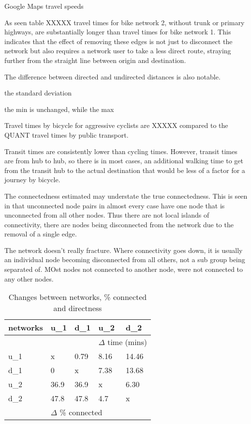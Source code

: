 \begin{table}
\centering
\caption{Google Maps travel speeds}
\label{table:travel_speeds}
\end{table}

As seen table XXXXX travel times for bike network 2, without trunk or primary highways, are substantially longer than travel times for bike network 1. This indicates that the effect of removing these edges is not just to disconnect the network but also requires a network user to take a less direct route, straying further from the straight line between origin and destination. 

The difference between directed and undirected distances is also notable. 

the standard deviation 

the min is unchanged, while the max 

Travel times by bicycle for aggressive cyclists are XXXXX compared to the QUANT travel times by public transport. 

Transit times are consistently lower than cycling times. However, transit times are from hub to hub, so there is in most cases, an additional walking time to get from the transit hub to the actual destination that would be less of a factor for a journey by bicycle. 

The connectedness estimated may understate the true connectedness. This is seen in that unconnected node pairs in almost every case have one node that is unconnected from all other nodes. Thus there are not local islands of connectivity, there are nodes being disconnected from the network due to the removal of a single edge. 

The network doesn't really fracture. Where connectivity goes down, it is usually an individual node becoming disconnected from all others, not a sub group being separated of. MOst nodes not connected to another node, were not connected to any other nodes. 


\begin{table}
\centering
\begin{tabular}{@{}lllll@{}}
\toprule
networks & u\_1   & d\_1  & u\_2            & d\_2          \\ \midrule
         &        &       & \multicolumn{2}{l}{$\Delta$ time (mins)}  \\
u\_1     & x      &  0.79 & 8.16            & 14.46         \\
d\_1     & 0      & x     & 7.38            & 13.68         \\
u\_2     & 36.9   & 36.9  & x               & 6.30          \\
d\_2     & 47.8   & 47.8  & 4.7             & x             \\
         & \multicolumn{3}{l}{$\Delta$ \% connected} &               \\ \bottomrule
\end{tabular}
\caption{Changes between networks, \% connected and directness}
\label{table:change between nets}
\end{table}

